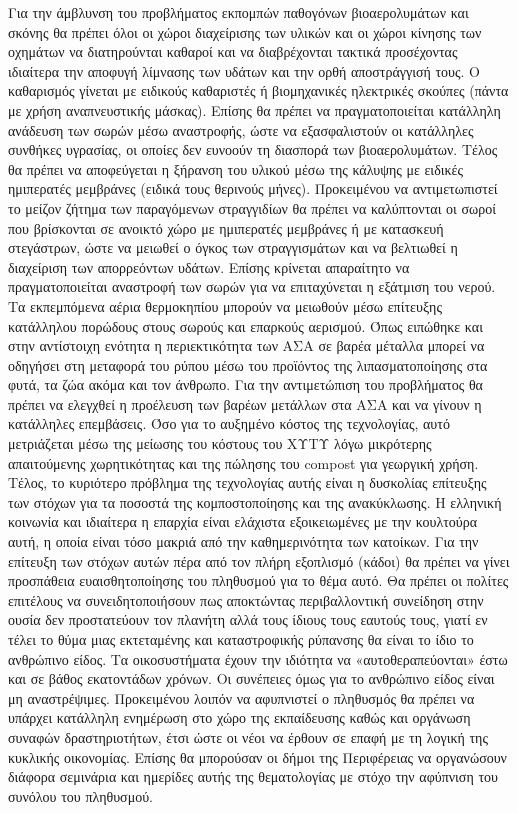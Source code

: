 \documentclass[12pt]{article}
\begin{document}
 	Για την άμβλυνση του προβλήματος εκπομπών παθογόνων βιοαερολυμάτων και σκόνης θα πρέπει όλοι οι χώροι διαχείρισης των υλικών και οι χώροι κίνησης των οχημάτων να διατηρούνται καθαροί και να διαβρέχονται τακτικά προσέχοντας ιδιαίτερα την αποφυγή λίμνασης των υδάτων και την ορθή αποστράγγισή τους. Ο καθαρισμός γίνεται με ειδικούς καθαριστές ή βιομηχανικές ηλεκτρικές σκούπες (πάντα με χρήση αναπνευστικής μάσκας). Επίσης θα πρέπει να πραγματοποιείται κατάλληλη ανάδευση των σωρών μέσω αναστροφής, ώστε να εξασφαλιστούν οι κατάλληλες συνθήκες υγρασίας, οι οποίες δεν ευνοούν τη διασπορά των βιοαερολυμάτων. Τέλος θα πρέπει να αποφεύγεται η ξήρανση του υλικού μέσω της κάλυψης με ειδικές ημιπερατές μεμβράνες (ειδικά τους θερινούς μήνες). Προκειμένου να αντιμετωπιστεί το μείζον ζήτημα των παραγόμενων στραγγιδίων θα πρέπει να καλύπτονται οι σωροί που βρίσκονται σε ανοικτό χώρο με ημιπερατές μεμβράνες ή με κατασκευή στεγάστρων, ώστε να μειωθεί ο όγκος των στραγγισμάτων και να βελτιωθεί η διαχείριση των απορρεόντων υδάτων. Επίσης κρίνεται απαραίτητο να πραγματοποιείται αναστροφή των σωρών για να επιταχύνεται η εξάτμιση του νερού. Τα εκπεμπόμενα αέρια θερμοκηπίου μπορούν να μειωθούν μέσω επίτευξης κατάλληλου πορώδους στους σωρούς και επαρκούς αερισμού. Όπως ειπώθηκε και στην αντίστοιχη ενότητα η περιεκτικότητα των ΑΣΑ σε βαρέα μέταλλα μπορεί να οδηγήσει στη μεταφορά του ρύπου μέσω του προϊόντος της λιπασματοποίησης στα φυτά, τα ζώα ακόμα και τον άνθρωπο. Για την αντιμετώπιση του προβλήματος θα πρέπει να ελεγχθεί η προέλευση των βαρέων μετάλλων στα ΑΣΑ και να γίνουν η κατάλληλες επεμβάσεις. Όσο για το αυξημένο κόστος της τεχνολογίας, αυτό μετριάζεται μέσω της μείωσης του κόστους του ΧΥΤΥ λόγω μικρότερης απαιτούμενης χωρητικότητας και της πώλησης του compost για γεωργική χρήση. Τέλος, το κυριότερο πρόβλημα της τεχνολογίας αυτής είναι η δυσκολίας επίτευξης των στόχων για τα ποσοστά της κομποστοποίησης και της ανακύκλωσης. Η ελληνική κοινωνία και ιδιαίτερα η επαρχία είναι ελάχιστα εξοικειωμένες με την κουλτούρα αυτή, η οποία είναι τόσο μακριά από την καθημερινότητα των κατοίκων. Για την επίτευξη των στόχων αυτών πέρα από τον πλήρη εξοπλισμό (κάδοι) θα πρέπει να γίνει προσπάθεια ευαισθητοποίησης του πληθυσμού για το θέμα αυτό. Θα πρέπει οι πολίτες επιτέλους να συνειδητοποιήσουν πως αποκτώντας περιβαλλοντική συνείδηση στην ουσία δεν προστατεύουν τον πλανήτη αλλά τους ίδιους τους εαυτούς τους, γιατί εν τέλει το θύμα μιας εκτεταμένης και καταστροφικής ρύπανσης θα είναι το ίδιο το ανθρώπινο είδος. Τα οικοσυστήματα έχουν την ιδιότητα να «αυτοθεραπεύονται» έστω και σε βάθος εκατοντάδων χρόνων. Οι συνέπειες όμως για το ανθρώπινο είδος είναι μη αναστρέψιμες. Προκειμένου λοιπόν να αφυπνιστεί ο πληθυσμός θα πρέπει να υπάρχει κατάλληλη ενημέρωση στο χώρο της εκπαίδευσης καθώς και οργάνωση συναφών δραστηριοτήτων, έτσι ώστε οι νέοι να έρθουν σε επαφή με τη λογική της κυκλικής οικονομίας. Επίσης θα μπορούσαν οι δήμοι της Περιφέρειας να οργανώσουν διάφορα σεμινάρια και ημερίδες αυτής της θεματολογίας με στόχο την αφύπνιση του συνόλου του πληθυσμού.  
 	
\end{document}
